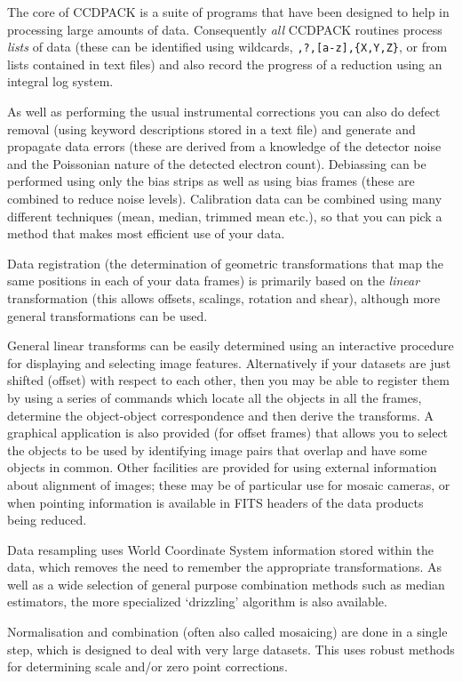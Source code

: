 \documentclass[twoside,11pt]{article}
\renewcommand{\_}{\texttt{\symbol{95}}}
\newcommand{\text}[1]{{\small \tt #1}}
\begin{document}
The core of CCDPACK is a suite of programs that have been designed to
help in processing large amounts of data.  Consequently {\em all\/}
CCDPACK routines process {\em lists\/} of data (these can be identified
using wildcards, \text{*,?,[a-z],\{X,Y,Z\}}, or from lists contained in
text files) and also record the progress of a reduction using an
integral log system.

As well as performing the usual instrumental corrections you can
also do defect removal (using keyword descriptions stored in a text file)
and generate and propagate data errors (these are derived from a knowledge
of the detector noise and the Poissonian nature of the detected
electron count).
Debiassing can be performed using only the bias strips as well as
using bias frames (these are combined to reduce noise levels).
Calibration data can be combined using many different techniques
(mean, median, trimmed mean etc.), so that you can pick a method that
makes most efficient use of your data.

Data registration (the determination of geometric transformations that
map the same positions in each of your data frames) is primarily based
on the {\em linear} transformation (this allows offsets, scalings,
rotation and shear), although more general transformations can be
used.

General linear transforms can be easily determined using an
interactive procedure for displaying and selecting image features.
Alternatively if your datasets are just shifted (offset) with respect
to each other, then you may be able to register them by using a series
of commands which locate all the objects in all the frames,
determine the object-object correspondence and then derive the
transforms.
A graphical application is also provided (for offset frames) that allows
you to select the objects to be used by identifying image pairs that
overlap and have some objects in common.
Other facilities are provided for using external information about
alignment of images; these may be of particular use for mosaic
cameras, or when pointing information is available in FITS headers
of the data products being reduced.

Data resampling uses World Coordinate System information stored 
within the data, which removes the need to remember the
appropriate transformations. 
As well as a wide selection of general purpose combination methods 
such as median estimators, the more specialized `drizzling' 
algorithm is also available.

Normalisation and combination (often also called mosaicing) 
are done in a single step, which is
designed to deal with very large datasets.
This uses robust methods for determining scale and/or zero point
corrections.
\end{document}
